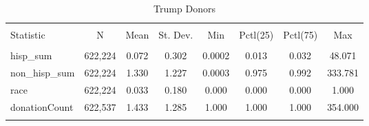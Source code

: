 
\begin{table}[!htbp] \centering 
  \caption{Trump Donors} 
  \label{} 
\scriptsize 
\begin{tabular}{@{\extracolsep{5pt}}lccccccc} 
\\[-1.8ex]\hline 
\hline \\[-1.8ex] 
Statistic & \multicolumn{1}{c}{N} & \multicolumn{1}{c}{Mean} & \multicolumn{1}{c}{St. Dev.} & \multicolumn{1}{c}{Min} & \multicolumn{1}{c}{Pctl(25)} & \multicolumn{1}{c}{Pctl(75)} & \multicolumn{1}{c}{Max} \\ 
\hline \\[-1.8ex] 
hisp\_sum & 622,224 & 0.072 & 0.302 & 0.0002 & 0.013 & 0.032 & 48.071 \\ 
non\_hisp\_sum & 622,224 & 1.330 & 1.227 & 0.0003 & 0.975 & 0.992 & 333.781 \\ 
race & 622,224 & 0.033 & 0.180 & 0.000 & 0.000 & 0.000 & 1.000 \\ 
donationCount & 622,537 & 1.433 & 1.285 & 1.000 & 1.000 & 1.000 & 354.000 \\ 
\hline \\[-1.8ex] 
\end{tabular} 
\end{table} 
